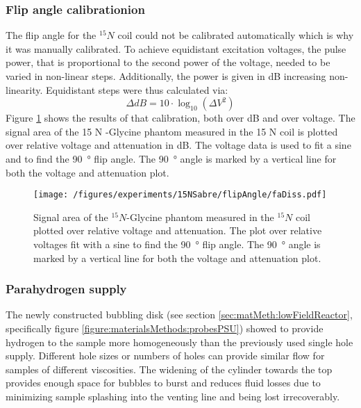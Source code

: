         \subsubsection{Flip angle calibrationion}
            The flip angle for the $^{15}N$ coil could not be calibrated automatically which is why it was manually calibrated. To achieve equidistant excitation voltages, the pulse power, that is proportional to the second power of the voltage, needed to be varied in non-linear steps. Additionally, the power is given in dB increasing non-linearity. Equidistant steps were thus calculated via:
            \begin{equation}
                \Delta dB = 10\cdot \log_{10}(\Delta V^2)
            \end{equation}
            Figure \ref{fig:results:15N:flipAngle} shows the results of that calibration, both over dB and over voltage. The signal area of the 15 N -Glycine phantom measured in the 15 N coil is  plotted over relative voltage and attenuation in dB. The voltage data is used to fit a sine and to find the \SI{90}{\degree} flip angle. The \SI{90}{\degree} angle is marked by a vertical line for both the voltage and attenuation plot. 
            \begin{figure}
                \texttt{[image: /figures/experiments/15NSabre/flipAngle/faDiss.pdf]}
                \caption[Flip angle calibratin 15N]{Signal area of the $^{15}N$-Glycine phantom measured in the $^{15}N$ coil plotted over relative voltage and attenuation. The plot over relative voltages fit with a sine to find the \SI{90}{\degree} flip angle. The \SI{90}{\degree} angle is marked by a vertical line for both the voltage and attenuation plot.}
                \label{fig:results:15N:flipAngle}
            \end{figure}
        \subsubsection{Parahydrogen supply}
        The newly constructed bubbling disk (see section \ref{sec:matMeth:lowFieldReactor}, specifically figure \ref{figure:materialsMethods:probesPSU}) showed to provide hydrogen to the sample more homogeneously than the previously used single hole supply. Different hole sizes or numbers of holes can provide similar flow for samples of different viscosities. The widening of the cylinder towards the top provides enough space for bubbles to burst and reduces fluid losses due to minimizing sample splashing into the venting line and being lost irrecoverably.

